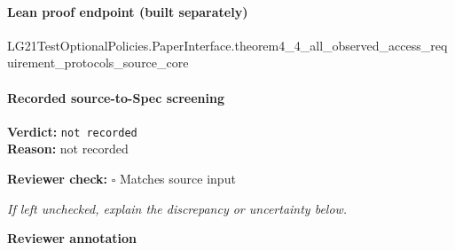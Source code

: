 \documentclass[10pt]{article}
\newcommand{\reviewerbox}{%
  \par\noindent\fbox{\parbox{0.96\linewidth}{\rule{0pt}{0.38in}}}\par
}
\newcommand{\reviewmatch}[1]{%
  \par\noindent\textbf{Reviewer check:} $\square$\; #1\par
  \noindent\emph{If left unchecked, explain the discrepancy or uncertainty below.}\par
}
\begin{document}
\paragraph{Lean proof endpoint (built separately)}\begin{ReviewVerbatim}
LG21TestOptionalPolicies.PaperInterface.theorem4_4_all_observed_access_requirement_protocols_source_core
\end{ReviewVerbatim}

\paragraph{Recorded source-to-Spec screening}
\textbf{Verdict:} \texttt{not recorded}
\\
\textbf{Reason:} not recorded
\reviewmatch{Matches source input}
\noindent\textbf{Reviewer annotation}\par
\reviewerbox
\end{document}
